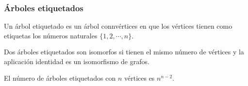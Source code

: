 \subsubsection{Árboles etiquetados}
\begin{ndef}
    Un árbol etiquetado es un árbol connvértices en que los vértices tienen como etiquetas los números naturales $\{1,2,\cdots,n\}$.
\end{ndef}
\begin{ndef}[Isomorfismo]
    Dos árboles etiquetados son isomorfos si tienen el mismo número de vértices y la aplicación identidad es un isomorfismo de grafos.
\end{ndef}
\begin{nth}
    El número de árboles etiquetados con $n$ vértices es $n^{n-2}$.
\end{nth}

